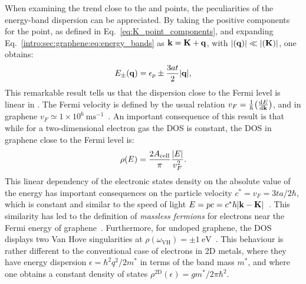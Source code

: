 When examining the trend close to the  and  points, the peculiarities of the energy-band dispersion can be appreciated. By taking the positive components for the  point, as defined in Eq.~\ref{eq:K_point_components}, and expanding Eq.~\ref{intro:sec:graphene:eq:energy_bands} as $\boldsymbol{\mathbf{k}} = \boldsymbol{\mathbf{K}} + \boldsymbol{\mathbf{q}}$, with $\abs{(\boldsymbol{\mathbf{q}})}\ll\abs{(\boldsymbol{\mathbf{K}})}$, one obtains:
%
\begin{equation}
    E_{\pm}(\boldsymbol{\mathbf{q}}) = \epsilon_p \pm \frac{3at}{2}\abs{\boldsymbol{\mathbf{q}}},
\end{equation}
%
This remarkable result tells us that the dispersion close to the Fermi level is linear in . The Fermi velocity is defined by the usual relation $v_F = \frac{1}{\hbar}\qty(\dv{E}{\boldsymbol{\mathbf{k}}})$, and in graphene $v_F\simeq1\times 10^6~\textrm{ms}^{-1}$~\cite{wallace1947band}. An important consequence of this result is that while for a two-dimensional electron gas the \gls{DOS} is constant, the \gls{DOS} in graphene close to the Fermi level is:
%
\begin{equation}\label{eq:grafene:density_of_states}
    \rho(E)=\frac{2A_\textrm{cell}}{\pi}\frac{\abs{E}}{v_F^2}.
\end{equation}
%
This linear dependency of the electronic states density on the absolute value of the energy has important consequences on the particle velocity $c^* = v_F = 3ta/2\hbar$, which is constant and similar to the speed of light $E = pc = c^*\hbar\abs{\boldsymbol{\mathbf{k}} - \boldsymbol{\mathbf{K}}}$~\cite{wolf2014graphene}. This similarity has led to the definition of \textit{massless fermions} for electrons near the Fermi energy of graphene~\cite{novoselov2004electric}. Furthermore, for undoped graphene, the \gls{DOS} displays two Van Hove singularities at $\rho(\omega_\textrm{VH}) = \pm\SI{1}{\electronvolt}$~\cite{bena2005quasiparticle}. This behaviour is rather different to the conventional case of electrons in 2D metals, where they have energy dispersion $\epsilon=\hbar^2 q^2 / 2 m^*$ in terms of the band mass $m^*$, and where one obtains a constant density of states $\rho^\textrm{2D}(\epsilon)=g m^* / 2 \pi \hbar^2$.

